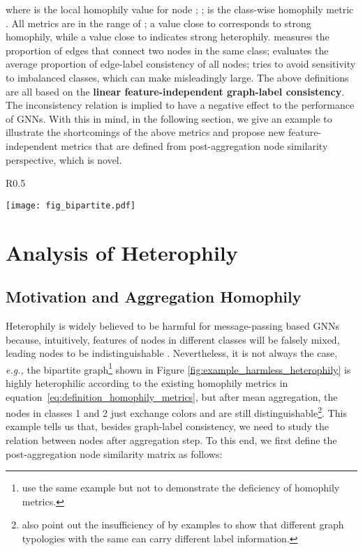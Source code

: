 \documentclass{article}
\newcommand\eg{\textit{e.g.,}}
\newcommand{\0}{{\boldsymbol{0}}}
\newcommand{\6}{{\partial}}
\newcommand{\8}{{\infty}}
\newcommand{\4}{{\nabla}}
\def\eqref#1{equation~\ref{#1}}
\begin{document}
where  is the local homophily value for node ; ;  is the class-wise homophily metric \cite{lim2021new}. All metrics are in the range of ; a value close to  corresponds to strong homophily, while a value close to  indicates strong heterophily.  measures the proportion of edges that connect two nodes in the same class;  evaluates the average proportion of edge-label consistency of all nodes;  tries to avoid sensitivity to imbalanced classes, which can make  misleadingly large. The above definitions are all based on the \textbf{linear feature-independent graph-label consistency}. The inconsistency relation is implied to have a negative effect to the performance of GNNs. With this in mind, in the following section, we give an example to illustrate the shortcomings of the above metrics and propose new feature-independent metrics that are defined from post-aggregation node similarity perspective, which is novel.


\begin{wrapfigure}{R}{0.5\textwidth}
  \begin{center}
    \texttt{[image: fig\_bipartite.pdf]}
  \end{center}
  \caption{Example of harmless heterophily}
  \label{fig:example_harmless_heterophily}
\end{wrapfigure}

\vspace{-0.3cm}
\section{Analysis of Heterophily}
\vspace{-0.2cm}
\label{sec:heterophily_analysis}
\subsection{Motivation and Aggregation Homophily}
\vspace{-0.1cm}
Heterophily is widely believed to be harmful for message-passing based GNNs \cite{zhu2020beyond,pei2020geom,chien2021adaptive} because, intuitively, features of nodes in different classes will be falsely mixed,
leading nodes to be indistinguishable \cite{zhu2020beyond}.
Nevertheless, it is not always the case, \eg{} the bipartite graph\footnote{\cite{ma2021homophily} use the same example but not to demonstrate the deficiency of homophily metrics.}  shown in Figure \ref{fig:example_harmless_heterophily} is highly heterophilic according to the existing homophily metrics in \eqref{eq:definition_homophily_metrics}, but after mean aggregation, the nodes in classes 1 and 2 just exchange colors and are still distinguishable\footnote{\cite{chien2021adaptive} also point out the insufficiency of  by examples to show that different graph typologies with the same  can carry different label information.}. This example tells us that, besides graph-label consistency, we need to study the relation between nodes after aggregation step. To this end, we first define the post-aggregation node similarity matrix as follows:
\end{document}

